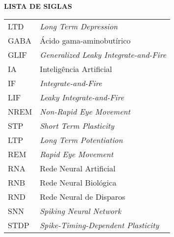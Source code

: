 \begin{center}
\textbf{LISTA DE SIGLAS}
\end{center}
\vspace*{0.5cm}
\begin{tabular}{ll}
LTD & \textit{Long Term Depression} \\
GABA & Ácido gama-aminobutírico \\
GLIF & \textit{Generalized Leaky Integrate-and-Fire} \\
IA & Inteligência Artificial \\
IF & \textit{Integrate-and-Fire} \\
LIF & \textit{Leaky Integrate-and-Fire} \\
NREM & \textit{Non-Rapid Eye Movement} \\
STP & \textit{Short Term Plasticity} \\
LTP & \textit{Long Term Potentiation} \\
REM & \textit{Rapid Eye Movement} \\
RNA & Rede Neural Artificial \\
RNB & Rede Neural Biológica \\
RND & Rede Neural de Disparos \\
SNN & \textit{Spiking Neural Network} \\
STDP & \textit{Spike-Timing-Dependent Plasticity } \\

\end{tabular}
\addtocounter{table}{0}